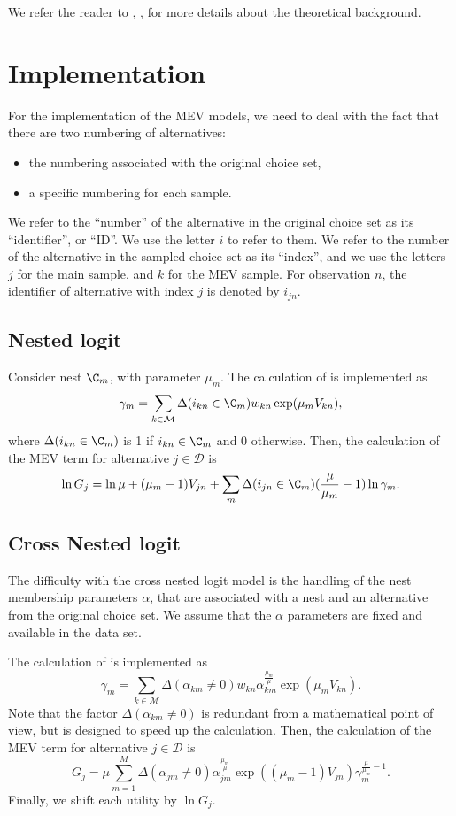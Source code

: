 \documentclass[12pt,a4paper]{article}
\newcommand{\D}{\mathcal{D}}
\begin{document}
We refer the reader to ,
,  for more details
about the theoretical background.

\section{Implementation}

For the implementation of the MEV models, we need to deal with the fact that there are
two numbering of alternatives:
\begin{itemize}
\item the numbering associated with the original choice set,
\item a specific numbering for each sample.
\end{itemize}
We refer to the ``number'' of the alternative in the original choice set as its ``identifier'', or ``ID''. We use the letter $i$ to refer to them. We refer to the number of the alternative in the sampled choice set as its ``index'', and we use the letters $j$ for the main sample, and $k$ for the MEV sample.
For observation $n$, the identifier of alternative with index $j$ is denoted by $i_{jn}$.

\subsection{Nested logit}

Consider nest $\C_m$, with parameter $\mu_m$. The calculation of  is implemented as
\[
  \gamma_m =  \sum_{k \in \mathcal{M}} \Delta(i_{kn} \in \C_m) w_{kn}\exp(\mu_m V_{kn}),
 \]
  where $\Delta(i_{kn} \in \C_m)$ is 1 if $i_{kn} \in \C_m$ and 0 otherwise.
  Then, the calculation of the MEV term for alternative $j\in\mathcal{D}$ is
\[
        \ln G_j = \ln \mu  + (\mu_m -1) V_{jn} + \sum_m \Delta(i_{jn}\in \C_m) (\frac{\mu}{\mu_m}-1)\ln \gamma_m.
\]
  
\subsection{Cross Nested logit}

The difficulty with the cross nested logit model is the handling of
the nest membership parameters $\alpha$, that are associated with a
nest and an alternative from the original choice set. We assume that the $\alpha$ parameters are fixed and available in the data set.

The calculation of  is implemented as
\[
\gamma_m =  \sum_{k\in\mathcal{M}} \Delta(\alpha_{km} \neq 0) w_{kn}\alpha_{km}^{\frac{\mu_m}{\mu}} \exp(\mu_m V_{kn}).
\]
Note that the factor $\Delta(\alpha_{km} \neq 0)$ is redundant from a mathematical point of view, but is designed to speed up the calculation. Then, the calculation of the MEV term for alternative $j\in\D$ is
\[
    G_j =  \mu \sum_{m=1}^M  \Delta(\alpha_{jm} \neq 0) \alpha_{jm}^{\frac{\mu_m}{\mu}} \exp((\mu_m-1)V_{jn})\gamma_m^{\frac{\mu}{\mu_m}-1}.
    \]
    Finally, we shift each utility by $\ln G_j$.
\end{document}

